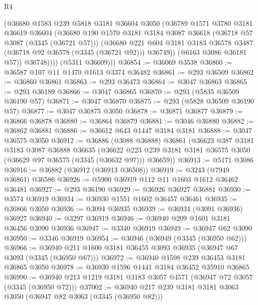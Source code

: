 \begin{lexlean}{R4}
\begin{coremodule}
              (@36680
                @1583
                @239
                @5818
                @3181
                @36604
                @3050
                (@36789
                  @1571
                  @3780
                  @3181
                  @36619
                  @36604
                  (@36680
                    @190
                    @1570
                    @3181
                    @3184
                    @3087
                    @36618
                    (@36718 @57 @3087 (@3345 (@36721 @57)))
                    (@36680
                      @221
                      @604
                      @3181
                      @3183
                      @36578
                      @3487
                      (@36718 @92 @36578 (@3345 (@36721 @92)))
                      @36749))
                  (@6163 @3086 @36181 @57))
                @36748))))
        (@5311 @36609)))
@36854 := @36069 @3538
@36860 := @36587 @107 @11 @1470 @1613 @3374 @36482
@36861 := @293 @36509
@36862 := @36860 @36861
@36863 := @293 @36473
@36864 := @3047 @36863
@36865 := @293 @36189
@36866 := @3047 @36865
@36870 := @293 (@5835 @36509 @36190 @57)
@36871 := @3047 @36870
@36875 := @293 (@5828 @36509 @36190 @57)
@36877 := @3047 @36875 @3050
@36878 := @36871 @36877
@36879 := @36866 @36878
@36880 := @36864 @36879
@36881 := @3046 @36880
@36882 := @36862 @36881
@36886 := @36612 @643 @1447 @3184 @3181
@36888 := @3047 @36575 @3050
@36912 := @36886
    (@3088 @36888)
    @36861
    (@36623
      @387
      @3181
      @3183
      @3087
      @36888
      @36635
      (@36622 @223 @239 @3181 @3181 @36575 @3050 (@36629 @97 @36575 (@3345 (@36632 @97))) @36659))
@36913 := @5171 @3086
@36916 := @36882 (@36912 (@36913 @36508))
@36919 := @3243 (@7949 @36861) @36586
@36926 := @5900 @36919 @112 @11 @1603 @1612 @36462 @36481
@36927 := @293 @36190
@36929 := @36926 @36927 @36881
@36930 := @3574 @36919
@36934 := @36930 @1551 @1602 @36457 @36461
@36935 := @36866 @3050
@36936 := @3094 @36935
@36939 := @36934 (@3091 @36936) @36927
@36940 := @3297 @36919
@36946 := @36940 @209 @1601 @3181 @36456 @3090 @36936
@36947 := @3340 @36919
@36949 := @36947 @62 @3090
@36950 := @3346 @36919
@36954 := @36946 (@36949 (@3345 (@36950 @62)))
@36966 := @36940 @211 @1600 @3181 @36455 @3093 @36935 (@36947 @67 @3093 (@3345 (@36950 @67)))
@36972 := @36940 @1598 @239 @36453 @3181 @36865 @3050
@36978 := @36930 @1596 @1441 @3184 @36452 @35910 @36865
@36990 := @36940 @213 @1219 @3181 @3183 @3057 @4571 (@36947 @72 @3057 (@3345 (@36950 @72)))
@37002 := @36940 @217 @239 @3181 @3181 @3063 @3050 (@36947 @82 @3063 (@3345 (@36950 @82)))

\end{coremodule}
\end{lexlean}
